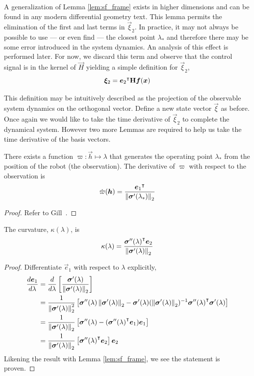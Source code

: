 \documentclass[oneside, 11pt]{book}
\begin{document}
A generalization of Lemma \ref{lem:sf_frame} exists in higher dimensions and can be found in any modern differential geometry text\cite{Kuhnel06}. This lemma permits the elimination of the first and last terms in $\vec{\xi}_2$. In practice, it may not always be possible to use --- or even find --- the closest point $\lambda_*$ and therefore there may be some error introduced in the system dynamics. An analysis of this effect is performed later. For now, we discard this term and observe that the control signal is in the kernel of $\vec{H}$ yielding a simple definition for $\vec{\xi}_2$,
$$\bm{\xi}_2 = {\bm{e}_2}^{\intercal}\mathbf{H}\bm{f}(\bm{x})$$

This definition may be intuitively described as the projection of the observable system dynamics on the orthogonal vector. Define a new state vector $\vec{\xi}$ as before. Once again we would like to take the time derivative of $\vec{\xi}_2$ to complete the dynamical system. However two more Lemmas are required to help us take the time derivative of the basis vectors.
\begin{lemma}
    There exists a function $\varpi:\vec{h}\mapsto\lambda$ that generates the operating point $\lambda_*$ from the position of the robot (the observation). The derivative of $\varpi$ with respect to the observation is
    $$\dot{\varpi}(\bm{h}) = \frac{{\bm{e}_1}^{\intercal}}{\left\|\bm{\sigma}'(\lambda_*)\right\|_2}$$
\end{lemma}
\begin{proof}
    Refer to Gill~\cite{Gill15}.
\end{proof}
\begin{lemma}
    The curvature, $\kappa(\lambda)$, is
    $$
        \kappa(\lambda) = \frac{{\bm{\sigma}''(\lambda)}^{\intercal}\bm{e}_2}{\left\|\bm{\sigma}'(\lambda)\right\|_2}
    $$
    \label{lem:kappa}
\end{lemma}
\begin{proof}
    Differentiate $\vec{e}_1$ with respect to $\lambda$ explicitly,
    \begin{align*}
        \frac{d\bm{e}_1}{d\lambda} &=  \frac{d}{d\lambda}\left[ \frac{\bm{\sigma}'(\lambda)}{\left\|\bm{\sigma}'(\lambda)\right\|_2}\right]\\
                                    &=  \frac{1}{\left\|\bm{\sigma}'(\lambda)\right\|_2^2}\left[\bm{\sigma}''(\lambda)\left\|\bm{\sigma}'(\lambda)\right\|_2-\bm{\sigma}'(\lambda)(\left\|\bm{\sigma}'(\lambda)\right\|_2)^{-1}{\bm{\sigma}''(\lambda)}^{\intercal}\bm{\sigma}'(\lambda)\right]\\
                                    &=  \frac{1}{\left\|\bm{\sigma}'(\lambda)\right\|_2}\left[\bm{\sigma}''(\lambda)-({\bm{\sigma}''(\lambda)}^{\intercal}\bm{e}_1)\bm{e}_1 \right]\\
                                    &=  \frac{1}{\left\|\bm{\sigma}'(\lambda)\right\|_2}\left[{\bm{\sigma}''(\lambda)}^{\intercal}\bm{e}_2\right]\bm{e}_2
    \end{align*}
    Likening the result with Lemma \ref{lem:sf_frame}, we see the statement is proven.
\end{proof}
\end{document}
